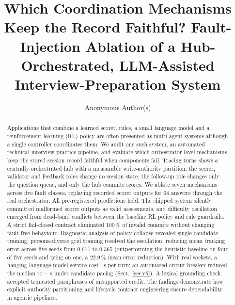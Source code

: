 \documentclass[runningheads]{llncs}
\begin{document}
\title{Which Coordination Mechanisms Keep the Record Faithful? Fault-Injection Ablation of a Hub-Orchestrated, LLM-Assisted Interview-Preparation System}
\author{Anonymous Author(s)}
\maketitle

\begin{abstract}
Applications that combine a learned scorer, rules, a small language model and a reinforcement-learning (RL) policy are often presented as multi-agent systems although a single controller coordinates them. We audit one such system, an automated technical-interview practice pipeline, and evaluate which orchestrator-level mechanisms keep the stored session record faithful when components fail. Tracing \nTurns{} turns shows a centrally orchestrated hub with a measurable write-authority partition: the scorer, validator and feedback roles change no session state, the follow-up role changes only the question queue, and only the hub commits scores. We ablate seven mechanisms across five fault classes, replaying recorded scorer outputs for 64 answers through the real orchestrator. All \predTotal{} pre-registered predictions held. The shipped system silently committed malformed scorer outputs as valid assessments, and difficulty oscillation emerged from dead-band conflicts between the baseline RL policy and rule guardrails. A strict fail-closed contract eliminated 100\,\% of invalid commits without changing fault-free behaviour. Diagnostic analysis of policy collapse revealed single-candidate training; persona-diverse grid training resolved the oscillation, reducing mean tracking error across five seeds from 0.677 to 0.365 (outperforming the heuristic baseline on four of five seeds and tying on one, a 22.9\,\% mean error reduction). With real sockets, a hanging language-model service cost \twoHangMed{}~s per turn; an automated circuit breaker reduced the median to \fiveMedSThirty--\fiveMedSSixty{}~s under candidate pacing (Sect.~\ref{sec:e5}). A lexical grounding check accepted truncated paraphrases of unsupported credit. The findings demonstrate how explicit authority partitioning and lifecycle contract engineering ensure dependability in agentic pipelines.
\end{abstract}
\end{document}
